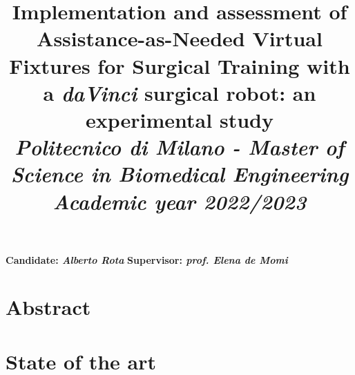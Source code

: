 \documentclass{article}
\title{\textbf{Implementation and assessment of Assistance-as-Needed Virtual Fixtures for Surgical Training with a \textit{daVinci} surgical robot: an experimental study}
\\
\vspace{0.5cm}\large{\textit{Politecnico di Milano - Master of Science in Biomedical Engineering}}
\\
\vspace{0.5cm}\textit{\small{Academic year 2022/2023}}}
\author{}
\date{}
\begin{document}
\maketitle
{\large\noindent \textbf{Candidate: \textit{Alberto Rota}}\newline
\textbf{Supervisor: \textit{prof. Elena de Momi}}}
\vspace{1cm}

\section*{Abstract}


\section{State of the art}

\end{document}
